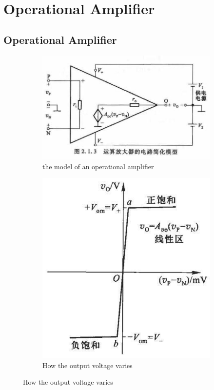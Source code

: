 \chapter{Operational Amplifier}

\section{Operational Amplifier}

\begin{figure}[H]
  \centering
  \begin{subfigure}{.45\textwidth}
    \centering
    \includegraphics[width=\linewidth]{figures/comparator}
    \caption{the model of an operational amplifier}
  \end{subfigure}
  \begin{subfigure}{.5\textwidth}
    \centering
    \includegraphics[width=0.6\linewidth]{figures/comparator-voltage-change}
    \caption{How the output voltage varies}
  \end{subfigure}
\end{figure}

